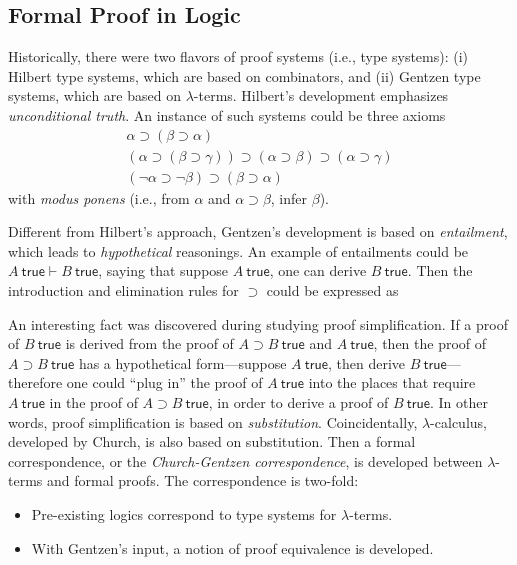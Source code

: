 \documentclass{article}
\newcommand{\entails}{\vdash}
\begin{document}
\subsection{Formal Proof in Logic}

Historically, there were two flavors of proof systems (i.e., type systems):
(i) Hilbert type systems, which are based on combinators, and
(ii) Gentzen type systems, which are based on $\lambda$-terms.
Hilbert's development emphasizes \emph{unconditional truth}.
An instance of such systems could be three axioms
\[
\begin{array}{c} 
\alpha \supset (\beta \supset \alpha) \\
(\alpha \supset (\beta \supset \gamma)) \supset (\alpha \supset \beta) \supset 
(\alpha \supset \gamma) \\
(\neg \alpha \supset \neg \beta) \supset (\beta \supset \alpha)
\end{array}
\]
with \emph{modus ponens} (i.e., from $\alpha$ and $\alpha \supset \beta$, infer 
$\beta$).

Different from Hilbert's approach, Gentzen's development is based on 
\emph{entailment}, which leads to \emph{hypothetical} reasonings.
An example of entailments could be $A~\mathsf{true} \entails B~\mathsf{true}$, 
saying that suppose $A~\mathsf{true}$, one can derive $B~\mathsf{true}$.
Then the introduction and elimination rules for $\supset$ could be expressed as

An interesting fact was discovered during studying proof simplification.
If a proof of $B~\mathsf{true}$ is derived from the proof of $A \supset 
B~\mathsf{true}$ and $A~\mathsf{true}$, then the proof of $A \supset 
B~\mathsf{true}$ has a hypothetical form---suppose $A~\mathsf{true}$, then 
derive 
$B~\mathsf{true}$---therefore one could ``plug in'' the proof of 
$A~\mathsf{true}$ into the places that require $A~\mathsf{true}$ in the proof of 
$A \supset B ~\mathsf{true}$, in order to derive a proof of $B~\mathsf{true}$.
In other words, proof simplification is based on \emph{substitution}.
Coincidentally, $\lambda$-calculus, developed by Church, is also based on 
substitution.
Then a formal correspondence, or the \emph{Church-Gentzen correspondence}, is 
developed between $\lambda$-terms and formal proofs.
The correspondence is two-fold:
\begin{itemize}
	\item Pre-existing logics correspond to type systems for $\lambda$-terms.
	\item With Gentzen's input, a notion of proof equivalence is developed.
\end{itemize}
\end{document}
